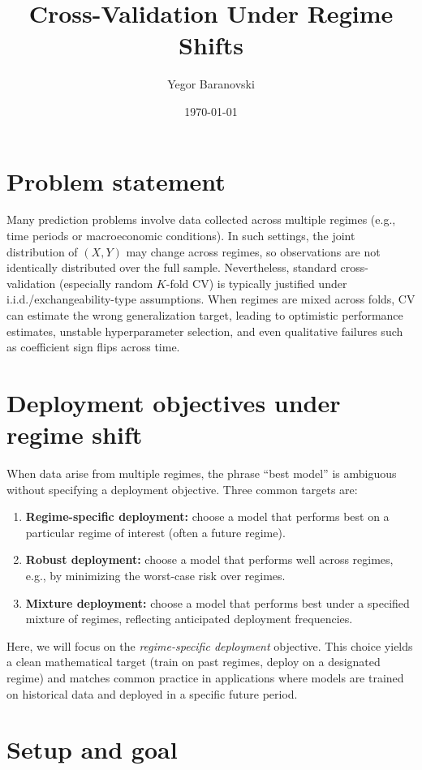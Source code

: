 \documentclass[11pt]{article}
\title{Cross-Validation Under Regime Shifts}
\author{Yegor Baranovski}
\date{\today}
\begin{document}
\maketitle

\section{Problem statement}
Many prediction problems involve data collected across multiple regimes (e.g., time periods or macroeconomic
conditions). In such settings, the joint distribution of $(X,Y)$ may change across regimes, so observations are not
identically distributed over the full sample. Nevertheless, standard cross-validation (especially random $K$-fold CV)
is typically justified under i.i.d./exchangeability-type assumptions. When regimes are mixed across folds, CV can
estimate the wrong generalization target, leading to optimistic performance estimates, unstable hyperparameter
selection, and even qualitative failures such as coefficient sign flips across time.



\section{Deployment objectives under regime shift}
When data arise from multiple regimes, the phrase ``best model'' is ambiguous without specifying a deployment
objective. Three common targets are:
\begin{enumerate}
  \item \textbf{Regime-specific deployment:} choose a model that performs best on a particular regime of interest
  (often a future regime).
  \item \textbf{Robust deployment:} choose a model that performs well across regimes, e.g., by minimizing the worst-case
  risk over regimes.
  \item \textbf{Mixture deployment:} choose a model that performs best under a specified mixture of regimes, reflecting
  anticipated deployment frequencies.
\end{enumerate}
Here, we will focus on the \emph{regime-specific deployment} objective. This choice yields a clean
mathematical target (train on past regimes, deploy on a designated regime) and matches common practice in
applications where models are trained on historical data and deployed in a specific future period.




\section{Setup and goal}
\end{document}
